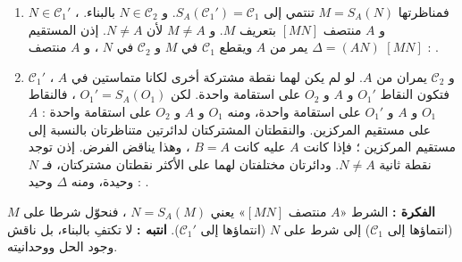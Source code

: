 \documentclass[12pt,a4paper]{article}
\begin{document}
\begin{corr}[title={تحدّي : نقطة منتصف}, stars=4, source={Axiomaths}]
\begin{enumerate}[itemsep=14pt]
\begin{itemize}
    \item $\Delta=(AN)$ ، و $M$ مناظرة $N$ بالنسبة إلى $A$.
  \end{itemize}
  \begin{center}
  \end{center}
  \item $N\in\mathcal{C}_1'$ ، فمناظرتها $M=S_A(N)$ تنتمي إلى $S_A(\mathcal{C}_1')=\mathcal{C}_1$. و $N\in\mathcal{C}_2$ بالبناء. و $A$ منتصف $[MN]$ بتعريف $M$. و $M\neq A$ لأن $N\neq A$.
  إذن المستقيم $\Delta=(AN)$ يمر من $A$ ويقطع $\mathcal{C}_1$ في $M$ و $\mathcal{C}_2$ في $N$ ، و $A$ منتصف $[MN]$ : .
  \item $\mathcal{C}_1'$ و $\mathcal{C}_2$ يمران من $A$. لو لم يكن لهما نقطة مشتركة أخرى لكانا متماستين في $A$ ، فتكون النقاط $O_1'$ و $A$ و $O_2$ على استقامة واحدة. لكن $O_1'=S_A(O_1)$ ، فالنقاط $O_1$ و $A$ و $O_1'$ على استقامة واحدة، ومنه $O_1$ و $A$ و $O_2$ على استقامة واحدة : $A$ على مستقيم المركزين.
  والنقطتان المشتركتان لدائرتين متناظرتان بالنسبة إلى مستقيم المركزين ؛ فإذا كانت $A$ عليه كانت $B=A$ ، وهذا يناقض الفرض. إذن توجد نقطة ثانية $N\neq A$.
  ودائرتان مختلفتان لهما على الأكثر نقطتان مشتركتان، فـ $N$ وحيدة، ومنه $\Delta$ وحيد : .
\end{enumerate}
\textbf{الفكرة :} الشرط «$A$ منتصف $[MN]$» يعني $N=S_A(M)$ ، فنحوّل شرطا على $M$ (انتماؤها إلى $\mathcal{C}_1$) إلى شرط على $N$ (انتماؤها إلى $\mathcal{C}_1'$). \quad \textbf{انتبه :} لا تكتفِ بالبناء، بل ناقش وجود الحل ووحدانيته.
\end{corr}
\end{document}
